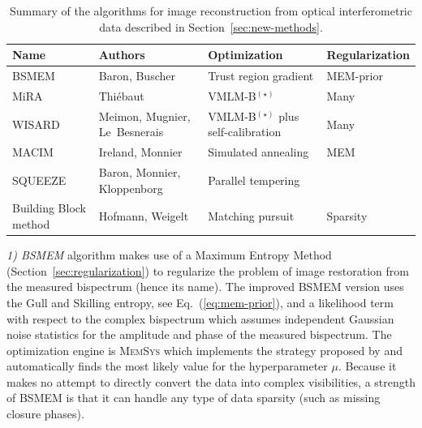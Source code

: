 \documentclass{article}
\newcommand{\Eq}[1]{Eq.~(\ref{#1})}
\newcommand{\BSMEM}{BSMEM\xspace}
\begin{document}
\begin{table}
  \begin{center}
    \begin{tabular}{p{6.2em}p{7.8em}p{8.9em}l}
      \hline
      \hline
      Name & Authors & Optimization & Regularization \\
      \hline
      BSMEM & Baron, Buscher & Trust region gradient & MEM-prior \\
      MiRA & Thi{\'e}baut & VMLM-B$^{(\star)}$ & Many \\
      WISARD & Meimon, Mugnier, Le~Besnerais &  VMLM-B$^{(\star)}$ plus self-calibration & Many \\
      \hline
      MACIM & Ireland, Monnier & Simulated annealing & MEM \\
      SQUEEZE & Baron, Monnier, Kloppenborg & Parallel tempering & \\
      \hline
      Building Block method & Hofmann, Weigelt & Matching pursuit & Sparsity \\
      \hline
      \hline
    \end{tabular}
  \end{center}
  \caption{\label{tab:algorithms} Summary of the algorithms for image
    reconstruction from optical interferometric data described in
    Section~\ref{sec:new-methods}.
   }
\end{table}

\textit{1) BSMEM} algorithm \citep{Buscher-1994-BSMEM,
  Baron_Young-2008-Marseille} makes use of a Maximum Entropy Method
(Section~\ref{sec:regularization}) to regularize the problem of image
restoration from the measured bispectrum (hence its name).  The improved BSMEM
version \citep{Baron_Young-2008-Marseille} uses the Gull and Skilling entropy,
see \Eq{eq:mem-prior}, and a likelihood term with respect to the complex
bispectrum which assumes independent Gaussian noise statistics for the
amplitude and phase of the measured bispectrum.  The optimization engine is
\textsc{MemSys} which implements the strategy proposed by
\citet{Skilling_Bryan-1984-maximum_entropy} and automatically finds the most
likely value for the hyperparameter $\mu$. Because it makes no attempt to
directly convert the data into complex visibilities, a strength of \BSMEM is
that it can handle any type of data sparsity (such as missing closure phases).
\end{document}
